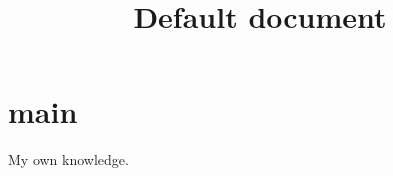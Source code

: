 \documentclass[11pt,a4paper]{article}
\begin{document}
\title{Default document}
\maketitle
\newpage

\pagestyle{normal}

\tableofcontents
\newpage

\section{main}

\newpage
\begin{thebibliography}{1}
 My own knowledge.
\end{thebibliography}
\end{document}

